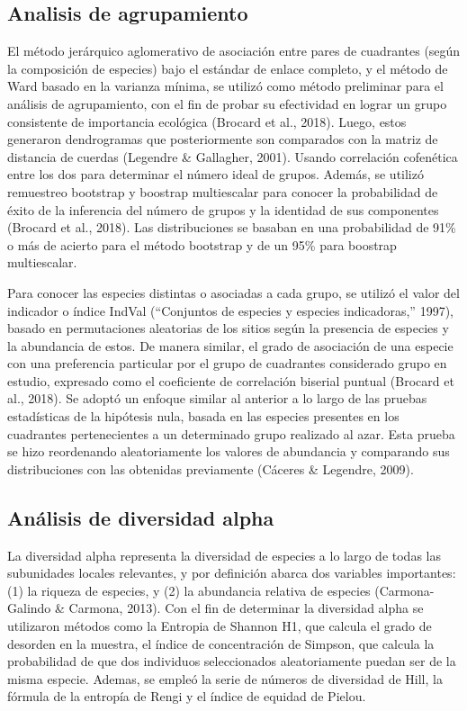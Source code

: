 \documentclass[11pt,]{article}
\begin{document}
\subsection{Analisis de agrupamiento}\label{analisis-de-agrupamiento}

El método jerárquico aglomerativo de asociación entre pares de
cuadrantes (según la composición de especies) bajo el estándar de enlace
completo, y el método de Ward basado en la varianza mínima, se utilizó
como método preliminar para el análisis de agrupamiento, con el fin de
probar su efectividad en lograr un grupo consistente de importancia
ecológica (Brocard et al., 2018). Luego, estos generaron dendrogramas
que posteriormente son comparados con la matriz de distancia de cuerdas
(Legendre \& Gallagher, 2001). Usando correlación cofenética entre los
dos para determinar el número ideal de grupos. Además, se utilizó
remuestreo bootstrap y boostrap multiescalar para conocer la
probabilidad de éxito de la inferencia del número de grupos y la
identidad de sus componentes (Brocard et al., 2018). Las distribuciones
se basaban en una probabilidad de 91\% o más de acierto para el método
bootstrap y de un 95\% para boostrap multiescalar.

Para conocer las especies distintas o asociadas a cada grupo, se utilizó
el valor del indicador o índice IndVal (``Conjuntos de especies y
especies indicadoras,'' 1997), basado en permutaciones aleatorias de los
sitios según la presencia de especies y la abundancia de estos. De
manera similar, el grado de asociación de una especie con una
preferencia particular por el grupo de cuadrantes considerado grupo en
estudio, expresado como el coeficiente de correlación biserial puntual
(Brocard et al., 2018). Se adoptó un enfoque similar al anterior a lo
largo de las pruebas estadísticas de la hipótesis nula, basada en las
especies presentes en los cuadrantes pertenecientes a un determinado
grupo realizado al azar. Esta prueba se hizo reordenando aleatoriamente
los valores de abundancia y comparando sus distribuciones con las
obtenidas previamente (Cáceres \& Legendre, 2009).

\subsection{Análisis de diversidad
alpha}\label{anuxe1lisis-de-diversidad-alpha}

La diversidad alpha representa la diversidad de especies a lo largo de
todas las subunidades locales relevantes, y por definición abarca dos
variables importantes: (1) la riqueza de especies, y (2) la abundancia
relativa de especies (Carmona-Galindo \& Carmona, 2013). Con el fin de
determinar la diversidad alpha se utilizaron métodos como la Entropia de
Shannon H1, que calcula el grado de desorden en la muestra, el índice de
concentración de Simpson, que calcula la probabilidad de que dos
individuos seleccionados aleatoriamente puedan ser de la misma especie.
Ademas, se empleó la serie de números de diversidad de Hill, la fórmula
de la entropía de Rengi y el índice de equidad de Pielou.
\end{document}
